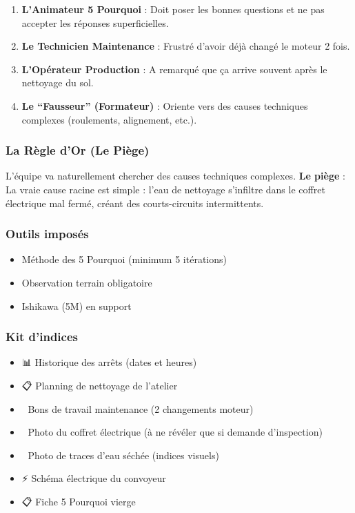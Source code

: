 \documentclass[
]{article}
\providecommand{\tightlist}{%
  \setlength{\itemsep}{0pt}\setlength{\parskip}{0pt}}
\begin{document}
\begin{enumerate}
\def\labelenumi{\arabic{enumi}.}
\tightlist
\item
  \textbf{L'Animateur 5 Pourquoi} : Doit poser les bonnes questions et
  ne pas accepter les réponses superficielles.
\item
  \textbf{Le Technicien Maintenance} : Frustré d'avoir déjà changé le
  moteur 2 fois.
\item
  \textbf{L'Opérateur Production} : A remarqué que ça arrive souvent
  après le nettoyage du sol.
\item
  \textbf{Le ``Fausseur'' (Formateur)} : Oriente vers des causes
  techniques complexes (roulements, alignement, etc.).
\end{enumerate}

\subsubsection{La Règle d'Or (Le
Piège)}\label{la-ruxe8gle-dor-le-piuxe8ge-2}

L'équipe va naturellement chercher des causes techniques complexes.
\textbf{Le piège} : La vraie cause racine est simple : l'eau de
nettoyage s'infiltre dans le coffret électrique mal fermé, créant des
courts-circuits intermittents.

\subsubsection{Outils imposés}\label{outils-imposuxe9s-2}

\begin{itemize}
\tightlist
\item
  Méthode des 5 Pourquoi (minimum 5 itérations)
\item
  Observation terrain obligatoire
\item
  Ishikawa (5M) en support
\end{itemize}

\subsubsection{Kit d'indices}\label{kit-dindices-2}

\begin{itemize}
\tightlist
\item
  📊 Historique des arrêts (dates et heures)
\item
  📋 Planning de nettoyage de l'atelier
\item
  🔧 Bons de travail maintenance (2 changements moteur)
\item
  📸 Photo du coffret électrique (à ne révéler que si demande
  d'inspection)
\item
  📸 Photo de traces d'eau séchée (indices visuels)
\item
  ⚡ Schéma électrique du convoyeur
\item
  📋 Fiche 5 Pourquoi vierge
\end{itemize}
\end{document}
